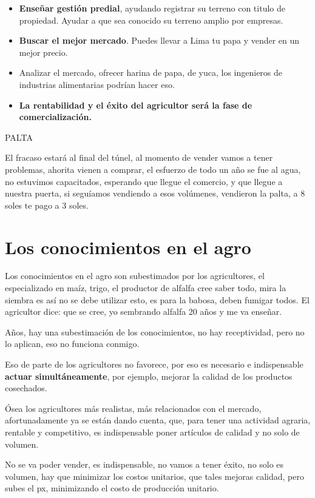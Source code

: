\documentclass[
  letterpaper,
  DIV=11,
  numbers=noendperiod]{scrartcl}
\begin{document}
\begin{itemize}
\item
  \textbf{Enseñar gestión predial}, ayudando registrar su terreno con
  titulo de propiedad. Ayudar a que sea conocido su terreno amplio por
  empresas.
\item
  \textbf{Buscar el mejor mercado}. Puedes llevar a Lima tu papa y
  vender en un mejor precio.
\item
  Analizar el mercado, ofrecer harina de papa, de yuca, los ingenieros
  de industrias alimentarias podrían hacer eso.
\item
  \textbf{La rentabilidad y el éxito del agricultor será la fase de
  comercialización.}
\end{itemize}

PALTA

El fracaso estará al final del túnel, al momento de vender vamos a tener
problemas, ahorita vienen a comprar, el esfuerzo de todo un año se fue
al agua, no estuvimos capacitados, esperando que llegue el comercio, y
que llegue a nuestra puerta, si seguíamos vendiendo a esos volúmenes,
vendieron la palta, a 8 soles te pago a 3 soles.

\hypertarget{los-conocimientos-en-el-agro}{%
\section{Los conocimientos en el
agro}\label{los-conocimientos-en-el-agro}}

Los conocimientos en el agro son subestimados por los agricultores, el
especializado en maíz, trigo, el productor de alfalfa cree saber todo,
mira la siembra es así no se debe utilizar esto, es para la babosa,
deben fumigar todos. El agricultor dice: que se cree, yo sembrando
alfalfa 20 años y me va enseñar.

Años, hay una subestimación de los conocimientos, no hay receptividad,
pero no lo aplican, eso no funciona conmigo.

Eso de parte de los agricultores no favorece, por eso es necesario e
indispensable \textbf{actuar simultáneamente}, por ejemplo, mejorar la
calidad de los productos cosechados.

Ósea los agricultores más realistas, más relacionados con el mercado,
afortunadamente ya se están dando cuenta, que, para tener una actividad
agraria, rentable y competitivo, es indispensable poner artículos de
calidad y no solo de volumen.

No se va poder vender, es indispensable, no vamos a tener éxito, no solo
es volumen, hay que minimizar los costos unitarios, que tales mejoras
calidad, pero subes el px, minimizando el costo de producción unitario.
\end{document}
